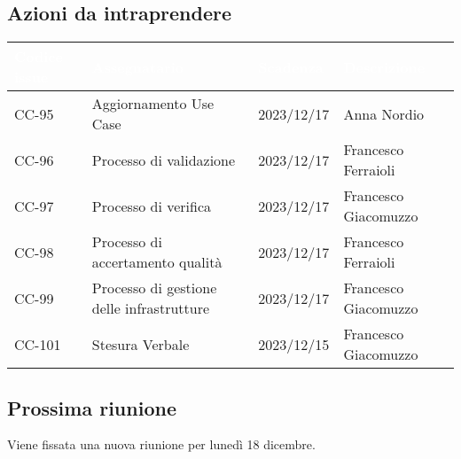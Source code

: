 \subsection{Azioni da intraprendere}
{
    \setlength{\tabcolsep}{10pt}
            \renewcommand{\arraystretch}{1.5}
            \begin{tabularx}{\textwidth}{| l | X | l | X |}
                 \hline
                 \rowcolor{headerrow}\textbf{\textcolor{white}{Codice issue}} & \textbf{\textcolor{white}{Assegnatario}} & \textbf{\textcolor{white}{Scadenza}} & \textbf{\textcolor{white}{Descrizione}} \\
                 \hline
                 CC-95 & Aggiornamento Use Case  & 2023/12/17 & Anna Nordio  \\
                 \hline
                 CC-96 & Processo di validazione & 2023/12/17 & Francesco Ferraioli \\
                 \hline
                 CC-97 & Processo di verifica& 2023/12/17 & Francesco Giacomuzzo \\
                 \hline
                 CC-98 & Processo di accertamento qualità & 2023/12/17 & Francesco Ferraioli\\
                 \hline
                 CC-99 & Processo di gestione delle infrastrutture & 2023/12/17 & Francesco Giacomuzzo\\
                 \hline
                 CC-101 & Stesura Verbale & 2023/12/15 & Francesco Giacomuzzo \\
                 \hline
            \end{tabularx}
}


\subsection{Prossima riunione} \label{subsec:riunione}
Viene fissata una nuova riunione per lunedì 18 dicembre.

